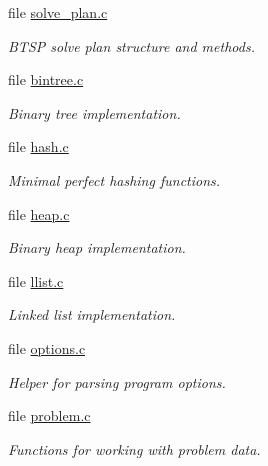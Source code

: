 \begin{CompactItemize}
\item 
file \hyperlink{solve__plan_8c}{solve\_\-plan.c}
\begin{CompactList}\small\item\em BTSP solve plan structure and methods. \item\end{CompactList}

\item 
file \hyperlink{bintree_8c}{bintree.c}
\begin{CompactList}\small\item\em Binary tree implementation. \item\end{CompactList}

\item 
file \hyperlink{lib_2common_2hash_8c}{hash.c}
\begin{CompactList}\small\item\em Minimal perfect hashing functions. \item\end{CompactList}

\item 
file \hyperlink{heap_8c}{heap.c}
\begin{CompactList}\small\item\em Binary heap implementation. \item\end{CompactList}

\item 
file \hyperlink{llist_8c}{llist.c}
\begin{CompactList}\small\item\em Linked list implementation. \item\end{CompactList}

\item 
file \hyperlink{options_8c}{options.c}
\begin{CompactList}\small\item\em Helper for parsing program options. \item\end{CompactList}

\item 
file \hyperlink{problem_8c}{problem.c}
\begin{CompactList}\small\item\em Functions for working with problem data. \item\end{CompactList}


\end{CompactItemize}
